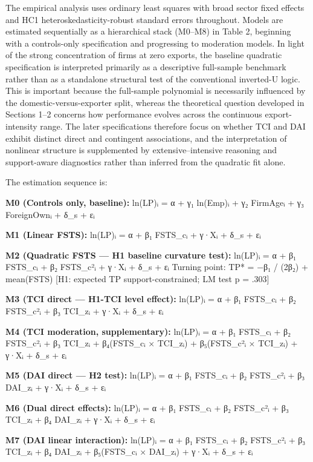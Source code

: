 \documentclass[12pt,a4paper]{article}
\begin{document}
The empirical analysis uses ordinary least squares with broad sector
fixed effects and HC1 heteroskedasticity-robust standard errors
throughout. Models are estimated sequentially as a hierarchical stack
(M0--M8) in Table 2, beginning with a controls-only specification and
progressing to moderation models. In light of the strong concentration
of firms at zero exports, the baseline quadratic specification is
interpreted primarily as a descriptive full-sample benchmark rather than
as a standalone structural test of the conventional inverted-U logic.
This is important because the full-sample polynomial is necessarily
influenced by the domestic-versus-exporter split, whereas the
theoretical question developed in Sections 1--2 concerns how performance
evolves across the continuous export-intensity range. The later
specifications therefore focus on whether TCI and DAI exhibit distinct
direct and contingent associations, and the interpretation of nonlinear
structure is supplemented by extensive--intensive reasoning and
support-aware diagnostics rather than inferred from the quadratic fit
alone.

The estimation sequence is:

\textbf{M0 (Controls only, baseline):} ln(LP)ᵢ = α + γ₁ ln(Emp)ᵢ + γ₂
FirmAgeᵢ + γ₃ ForeignOwnᵢ + δ\_s + εᵢ

\textbf{M1 (Linear FSTS):} ln(LP)ᵢ = α + β₁ FSTS\_cᵢ + γ·Xᵢ + δ\_s + εᵢ

\textbf{M2 (Quadratic FSTS --- H1 baseline curvature test):} ln(LP)ᵢ = α
+ β₁ FSTS\_cᵢ + β₂ FSTS\_c²ᵢ + γ·Xᵢ + δ\_s + εᵢ Turning point: TP* = −β₁
/ (2β₂) + mean(FSTS) {[}H1: expected TP support-constrained; LM test p =
.303{]}

\textbf{M3 (TCI direct --- H1-TCI level effect):} ln(LP)ᵢ = α + β₁
FSTS\_cᵢ + β₂ FSTS\_c²ᵢ + β₃ TCI\_zᵢ + γ·Xᵢ + δ\_s + εᵢ

\textbf{M4 (TCI moderation, supplementary):} ln(LP)ᵢ = α + β₁ FSTS\_cᵢ +
β₂ FSTS\_c²ᵢ + β₃ TCI\_zᵢ + β₄(FSTS\_cᵢ × TCI\_zᵢ) + β₅(FSTS\_c²ᵢ ×
TCI\_zᵢ) + γ·Xᵢ + δ\_s + εᵢ

\textbf{M5 (DAI direct --- H2 test):} ln(LP)ᵢ = α + β₁ FSTS\_cᵢ + β₂
FSTS\_c²ᵢ + β₃ DAI\_zᵢ + γ·Xᵢ + δ\_s + εᵢ

\textbf{M6 (Dual direct effects):} ln(LP)ᵢ = α + β₁ FSTS\_cᵢ + β₂
FSTS\_c²ᵢ + β₃ TCI\_zᵢ + β₄ DAI\_zᵢ + γ·Xᵢ + δ\_s + εᵢ

\textbf{M7 (DAI linear interaction):} ln(LP)ᵢ = α + β₁ FSTS\_cᵢ + β₂
FSTS\_c²ᵢ + β₃ TCI\_zᵢ + β₄ DAI\_zᵢ + β₅(FSTS\_cᵢ × DAI\_zᵢ) + γ·Xᵢ +
δ\_s + εᵢ
\end{document}
